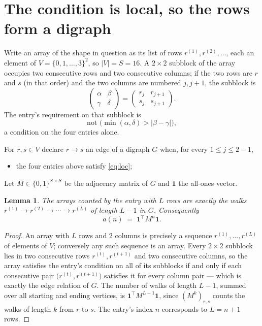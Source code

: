 \documentclass[11pt,a4paper]{article}
\theoremstyle{plain}
\newtheorem{lemma}[theorem]{Lemma}
\theoremstyle{definition}
\begin{document}
\section{The condition is local, so the rows form a digraph}

Write an array of the shape in question as its list of rows
$r^{(1)},r^{(2)},\dots$, each an element of
$V=\{0,1,\dots,3\}^{2}$, so $|V|=S=16$. A $2\times2$ subblock of the array
occupies two consecutive rows and two consecutive columns; if the two rows are $r$
and $s$ (in that order) and the two columns are numbered $j,j+1$,
the subblock is
\[
\begin{pmatrix}\alpha&\beta\\\gamma&\delta\end{pmatrix}=\begin{pmatrix}r_j&r_{j+1}\\s_j&s_{j+1}\end{pmatrix}.
\]
The entry's requirement on that subblock is
\begin{equation}\label{eq:loc}
\text{not }\bigl(\min(\alpha,\delta)>|\beta-\gamma|\bigr),
\end{equation}
a condition on the four entries alone.

For $r,s\in V$ declare $r\to s$ an edge of a digraph $G$ when, for every
$1\le j\le 2-1$,
\begin{itemize}
\item the four entries above satisfy \eqref{eq:loc};

\end{itemize}
Let $M\in\{0,1\}^{S\times S}$ be the adjacency matrix of $G$ and $\mathbf{1}$ the
all-ones vector.

\begin{lemma}\label{lem:walk}
The arrays counted by the entry with $L$ rows are exactly the walks
$r^{(1)}\to r^{(2)}\to\cdots\to r^{(L)}$ of length $L-1$ in $G$. Consequently
\[
a(n)\;=\;\mathbf{1}^{\!\top}M^{n}\mathbf{1} .
\]
\end{lemma}

\begin{proof}
An array with $L$ rows and $2$ columns is precisely a sequence
$r^{(1)},\dots,r^{(L)}$ of elements of $V$; conversely any such sequence is an array.
Every $2\times2$ subblock lies in two consecutive rows $r^{(t)},r^{(t+1)}$ and two
consecutive columns, so the array satisfies the entry's condition on all of its subblocks
if and only if each consecutive pair $\bigl(r^{(t)},r^{(t+1)}\bigr)$ satisfies it for
every column pair --- which is exactly the edge relation of $G$. The number of walks of
length $L-1$, summed over all starting and ending vertices, is
$\mathbf{1}^{\!\top}M^{L-1}\mathbf{1}$, since $(M^{k})_{r,s}$ counts the walks of
length $k$ from $r$ to $s$. The entry's index $n$ corresponds to $L=n+1$ rows.
\end{proof}
\end{document}
